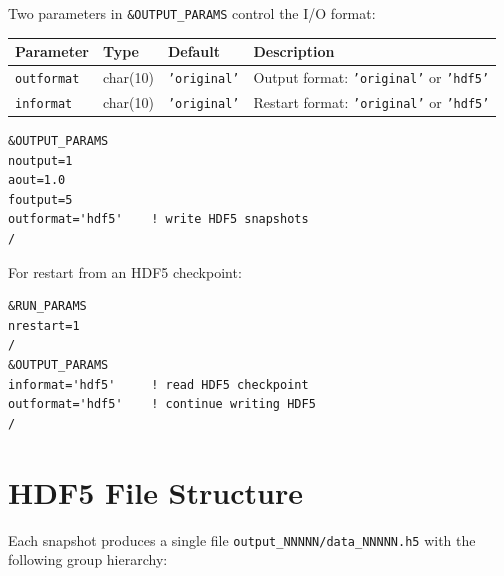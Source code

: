 \documentclass[11pt,fleqn]{book}
\begin{document}
Two parameters in \texttt{\&OUTPUT\_PARAMS} control the I/O format:

\begin{center}
\begin{tabular}{llll}
\toprule
\textbf{Parameter} & \textbf{Type} & \textbf{Default} & \textbf{Description} \\
\midrule
\texttt{outformat} & char(10) & \texttt{'original'} & Output format: \texttt{'original'} or \texttt{'hdf5'} \\
\texttt{informat} & char(10) & \texttt{'original'} & Restart format: \texttt{'original'} or \texttt{'hdf5'} \\
\bottomrule
\end{tabular}
\end{center}

\begin{codebox}
\begin{lstlisting}[style=fortran,numbers=none]
&OUTPUT_PARAMS
noutput=1
aout=1.0
foutput=5
outformat='hdf5'    ! write HDF5 snapshots
/
\end{lstlisting}
\end{codebox}

For restart from an HDF5 checkpoint:
\begin{codebox}
\begin{lstlisting}[style=fortran,numbers=none]
&RUN_PARAMS
nrestart=1
/
&OUTPUT_PARAMS
informat='hdf5'     ! read HDF5 checkpoint
outformat='hdf5'    ! continue writing HDF5
/
\end{lstlisting}
\end{codebox}


\section{HDF5 File Structure}

Each snapshot produces a single file \texttt{output\_NNNNN/data\_NNNNN.h5} with the following group hierarchy:
\end{document}
